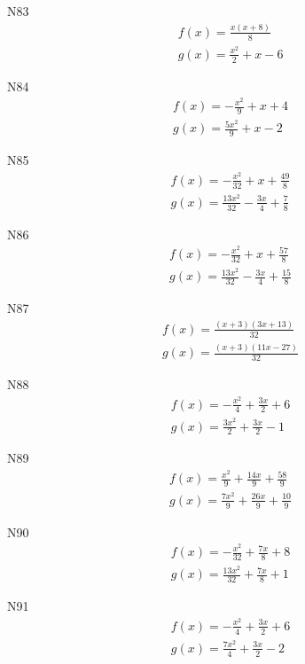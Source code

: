 \documentclass[11pt]{report}
\begin{document}
N83
\begin{align*}
 f(x) = \frac{x \left(x + 8\right)}{8}\\
 g(x) = \frac{x^{2}}{2} + x - 6
\end{align*}

N84
\begin{align*}
 f(x) = - \frac{x^{2}}{9} + x + 4\\
 g(x) = \frac{5 x^{2}}{9} + x - 2
\end{align*}

N85
\begin{align*}
 f(x) = - \frac{x^{2}}{32} + x + \frac{49}{8}\\
 g(x) = \frac{13 x^{2}}{32} - \frac{3 x}{4} + \frac{7}{8}
\end{align*}

N86
\begin{align*}
 f(x) = - \frac{x^{2}}{32} + x + \frac{57}{8}\\
 g(x) = \frac{13 x^{2}}{32} - \frac{3 x}{4} + \frac{15}{8}
\end{align*}

N87
\begin{align*}
 f(x) = \frac{\left(x + 3\right) \left(3 x + 13\right)}{32}\\
 g(x) = \frac{\left(x + 3\right) \left(11 x - 27\right)}{32}
\end{align*}

N88
\begin{align*}
 f(x) = - \frac{x^{2}}{4} + \frac{3 x}{2} + 6\\
 g(x) = \frac{3 x^{2}}{2} + \frac{3 x}{2} - 1
\end{align*}

N89
\begin{align*}
 f(x) = \frac{x^{2}}{9} + \frac{14 x}{9} + \frac{58}{9}\\
 g(x) = \frac{7 x^{2}}{9} + \frac{26 x}{9} + \frac{10}{9}
\end{align*}

N90
\begin{align*}
 f(x) = - \frac{x^{2}}{32} + \frac{7 x}{8} + 8\\
 g(x) = \frac{13 x^{2}}{32} + \frac{7 x}{8} + 1
\end{align*}

N91
\begin{align*}
 f(x) = - \frac{x^{2}}{4} + \frac{3 x}{2} + 6\\
 g(x) = \frac{7 x^{2}}{4} + \frac{3 x}{2} - 2
\end{align*}
\end{document}
